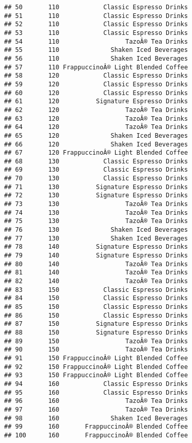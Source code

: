\documentclass[
]{article}
\begin{document}
\begin{verbatim}
## 50       110            Classic Espresso Drinks
## 51       110            Classic Espresso Drinks
## 52       110            Classic Espresso Drinks
## 53       110            Classic Espresso Drinks
## 54       110                  TazoÂ® Tea Drinks
## 55       110              Shaken Iced Beverages
## 56       110              Shaken Iced Beverages
## 57       110 FrappuccinoÂ® Light Blended Coffee
## 58       120            Classic Espresso Drinks
## 59       120            Classic Espresso Drinks
## 60       120            Classic Espresso Drinks
## 61       120          Signature Espresso Drinks
## 62       120                  TazoÂ® Tea Drinks
## 63       120                  TazoÂ® Tea Drinks
## 64       120                  TazoÂ® Tea Drinks
## 65       120              Shaken Iced Beverages
## 66       120              Shaken Iced Beverages
## 67       120 FrappuccinoÂ® Light Blended Coffee
## 68       130            Classic Espresso Drinks
## 69       130            Classic Espresso Drinks
## 70       130            Classic Espresso Drinks
## 71       130          Signature Espresso Drinks
## 72       130          Signature Espresso Drinks
## 73       130                  TazoÂ® Tea Drinks
## 74       130                  TazoÂ® Tea Drinks
## 75       130                  TazoÂ® Tea Drinks
## 76       130              Shaken Iced Beverages
## 77       130              Shaken Iced Beverages
## 78       140          Signature Espresso Drinks
## 79       140          Signature Espresso Drinks
## 80       140                  TazoÂ® Tea Drinks
## 81       140                  TazoÂ® Tea Drinks
## 82       140                  TazoÂ® Tea Drinks
## 83       150            Classic Espresso Drinks
## 84       150            Classic Espresso Drinks
## 85       150            Classic Espresso Drinks
## 86       150            Classic Espresso Drinks
## 87       150          Signature Espresso Drinks
## 88       150          Signature Espresso Drinks
## 89       150                  TazoÂ® Tea Drinks
## 90       150                  TazoÂ® Tea Drinks
## 91       150 FrappuccinoÂ® Light Blended Coffee
## 92       150 FrappuccinoÂ® Light Blended Coffee
## 93       150 FrappuccinoÂ® Light Blended Coffee
## 94       160            Classic Espresso Drinks
## 95       160            Classic Espresso Drinks
## 96       160                  TazoÂ® Tea Drinks
## 97       160                  TazoÂ® Tea Drinks
## 98       160              Shaken Iced Beverages
## 99       160       FrappuccinoÂ® Blended Coffee
## 100      160       FrappuccinoÂ® Blended Coffee

\end{verbatim}
\end{document}
